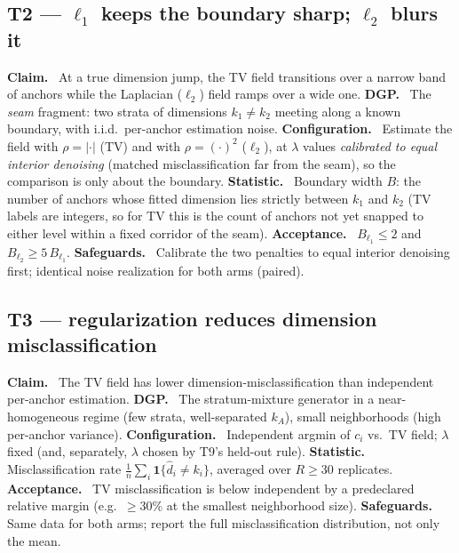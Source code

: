 \documentclass[11pt]{article}
\theoremstyle{definition}
\newcommand{\field}[1]{\smallskip\noindent\textbf{\textsf{#1.}}\ }
\begin{document}
\subsection{T2 --- $\ell_1$ keeps the boundary sharp; $\ell_2$ blurs it}
\field{Claim} At a true dimension jump, the TV field transitions over a narrow
band of anchors while the Laplacian ($\ell_2$) field ramps over a wide one.
\field{DGP} The \emph{seam} fragment: two strata of dimensions $k_1\neq k_2$
meeting along a known boundary, with i.i.d.\ per-anchor estimation noise.
\field{Configuration} Estimate the field with $\rho=|\cdot|$ (TV) and with
$\rho=(\cdot)^2$ ($\ell_2$), at $\lambda$ values \emph{calibrated to equal
interior denoising} (matched misclassification far from the seam), so the
comparison is only about the boundary.
\field{Statistic} Boundary width $B$: the number of anchors whose fitted dimension
lies strictly between $k_1$ and $k_2$ (TV labels are integers, so for TV this is
the count of anchors not yet snapped to either level within a fixed corridor of
the seam).
\field{Acceptance} $B_{\ell_1}\le 2$ and $B_{\ell_2}\ge 5\,B_{\ell_1}$.
\field{Safeguards} Calibrate the two penalties to equal interior denoising first;
identical noise realization for both arms (paired).

\subsection{T3 --- regularization reduces dimension misclassification}
\field{Claim} The TV field has lower dimension-misclassification than independent
per-anchor estimation.
\field{DGP} The stratum-mixture generator in a near-homogeneous regime (few
strata, well-separated $k_A$), small neighborhoods (high per-anchor variance).
\field{Configuration} Independent argmin of $c_i$ vs.\ TV field; $\lambda$ fixed
(and, separately, $\lambda$ chosen by T9's held-out rule).
\field{Statistic} Misclassification rate $\frac1n\sum_i\mathbf 1\{\widehat d_i\neq
k_i\}$, averaged over $R\ge 30$ replicates.
\field{Acceptance} TV misclassification is below independent by a predeclared
relative margin (e.g.\ $\ge 30\%$ at the smallest neighborhood size).
\field{Safeguards} Same data for both arms; report the full misclassification
distribution, not only the mean.
\end{document}
